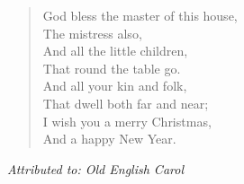 
\begin{verse}
God bless the master of this house,\\
\hspace*{2em}The mistress also,\\
And all the little children,\\
\hspace*{2em}That round the table go.\\[0.7em]

And all your kin and folk,\\
\hspace*{2em}That dwell both far and near;\\
I wish you a merry Christmas,\\
\hspace*{2em}And a happy New Year.%
\end{verse}

\vspace{0.5\baselineskip}
\noindent\textit{Attributed to: Old English Carol}
\newpage
